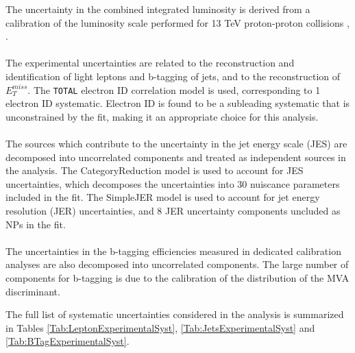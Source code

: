 The uncertainty in the combined integrated luminosity is derived from a calibration of the luminosity scale performed for 13 TeV proton-proton collisions \cite{lumi}, \cite{LUCID2}.

\paragraph{}
The experimental uncertainties are related to the reconstruction and identification of light leptons and b-tagging of jets, and to the reconstruction of $E^{miss}_T$. The \verb!TOTAL! electron ID correlation model is used, corresponding to 1 electron ID systematic. Electron ID is found to be a subleading systematic that is unconstrained by the fit, making it an appropriate choice for this analysis.

\paragraph{}
The sources which contribute to the uncertainty in the jet energy scale (JES) \cite{jes} are decomposed into uncorrelated components and treated as independent sources in the analysis. The CategoryReduction model is used to account for JES uncertainties, which decomposes the uncertainties into 30 nuiscance parameters included in the fit. The SimpleJER model is used to account for jet energy resolution (JER) uncertainties, and 8 JER uncertainty components uncluded as NPs in the fit. 

\paragraph{}
The uncertainties in the b-tagging efficiencies measured in dedicated calibration analyses \cite{btag_cal} are also decomposed into uncorrelated components. The large number of components for b-tagging is due to the calibration of the distribution of the MVA discriminant.  


The full list of systematic uncertainties considered in the analysis is summarized in Tables
\ref{Tab:LeptonExperimentalSyst}, \ref{Tab:JetsExperimentalSyst} and \ref{Tab:BTagExperimentalSyst}.

